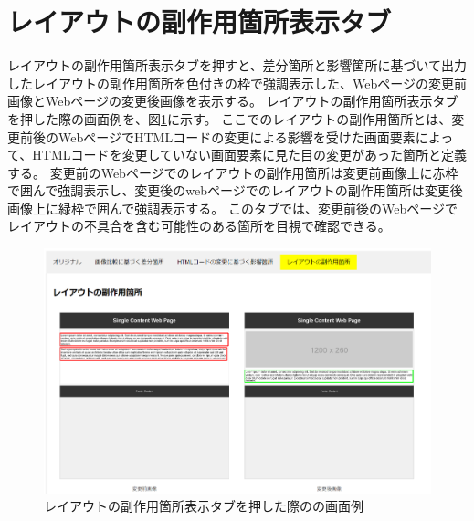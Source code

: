 \section{レイアウトの副作用箇所表示タブ}\label{subsec:subeffect_tab}
レイアウトの副作用箇所表示タブを押すと、差分箇所と影響箇所に基づいて出力したレイアウトの副作用箇所を色付きの枠で強調表示した、Webページの変更前画像とWebページの変更後画像を表示する。
レイアウトの副作用箇所表示タブを押した際の画面例を、図\ref{fig: Appearance_subEffect_tab}に示す。
ここでのレイアウトの副作用箇所とは、変更前後のWebページでHTMLコードの変更による影響を受けた画面要素によって、HTMLコードを変更していない画面要素に見た目の変更があった箇所と定義する。
変更前のWebページでのレイアウトの副作用箇所は変更前画像上に赤枠で囲んで強調表示し、変更後のwebページでのレイアウトの副作用箇所は変更後画像上に緑枠で囲んで強調表示する。
このタブでは、変更前後のWebページでレイアウトの不具合を含む可能性のある箇所を目視で確認できる。
\begin{figure}[tp]
    \begin{center}
        \includegraphics[width=1.0\columnwidth]{image/3_subEffect_tab.png}
        \caption{レイアウトの副作用箇所表示タブを押した際の\toolName の画面例}
        \label{fig: Appearance_subEffect_tab}
    \end{center}
\end{figure}

